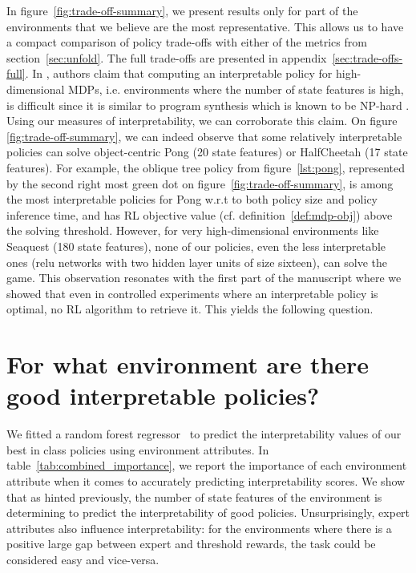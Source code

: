 In figure~\ref{fig:trade-off-summary}, we present results only for part of the environments that we believe are the most representative.
This allows us to have a compact comparison of policy trade-offs with either of the metrics from section~\ref{sec:unfold}.
The full trade-offs are presented in appendix~\ref{sec:trade-offs-full}.
In \cite{glanois-survey}, authors claim that computing an interpretable policy for high-dimensional MDPs, i.e. environments where the number of state features is high, is difficult since it is similar to program synthesis which is known to be NP-hard \cite{program-synth}.
Using our measures of interpretability, we can corroborate this claim.
On figure \ref{fig:trade-off-summary}, we can indeed observe that some relatively interpretable policies can solve object-centric Pong (20 state features) or HalfCheetah (17 state features). 
For example, the oblique tree policy from figure~\ref{lst:pong}, represented by the second right most green dot on figure~\ref{fig:trade-off-summary}, is among the most interpretable policies for Pong w.r.t to both policy size and policy inference time, and has RL objective value (cf. definition~\ref{def:mdp-obj}) above the solving threshold.  
However, for very high-dimensional environments like Seaquest (180 state features), none of our policies, even the less interpretable ones (relu networks with two hidden layer units of size sixteen), can solve the game.
This observation resonates with the first part of the manuscript where we showed that even in controlled experiments where an interpretable policy is optimal, no RL algorithm to retrieve it.
This yields the following question.

\section{For what environment are there good interpretable policies?}
We fitted a random forest regressor~\cite{random} to predict the interpretability values of our best in class policies using environment attributes. 
In table~\ref{tab:combined_importance}, we report the importance of each environment attribute when it comes to accurately predicting interpretability scores.
We show that as hinted previously, the number of state features of the environment is determining to predict the interpretability of good policies.
Unsurprisingly, expert attributes also influence interpretability: for the environments where there is a positive large gap between expert and threshold rewards, the task could be considered easy and vice-versa.

